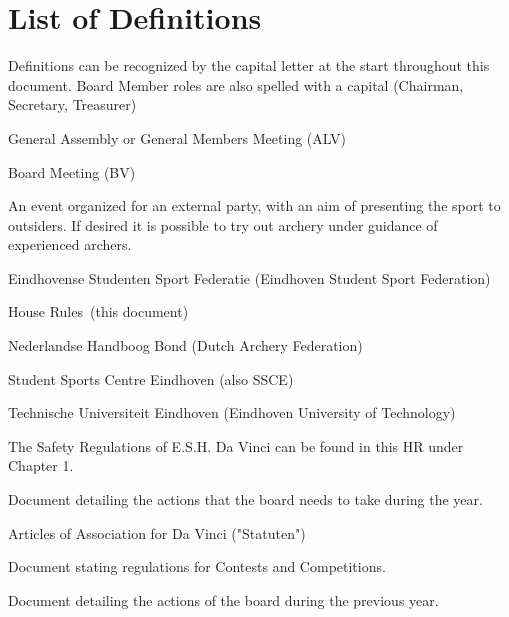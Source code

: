 \documentclass[a4paper]{article}
\newcommand{\Abr}{Administrative Regulations} %
\newcommand{\Asta}{Bylaws} %
\newcommand{\Ahr}{House Rules} %
\newcommand{\Asr}{Safety Rules} %
\newcommand{\Awr}{Contest Rules} %
\newcommand{\Ajv}{Annual Report} %
\begin{document}
\tableofcontents
\pagebreak
\section*{List of Definitions}
{\g Definitions can be recognized by the capital letter at the start throughout this document. Board Member roles are also spelled with a capital (Chairman, Secretary, Treasurer)}

\begin{description}[font=\sffamily\bfseries, leftmargin=1cm, style=nextline]
  \item[GA]
    General Assembly or General Members Meeting (ALV)
  \item[BM]
    Board Meeting (BV)
  \item[Workshop]
    An event organized for an external party, with an aim of presenting the sport to outsiders. If desired it is possible to try out archery under guidance of experienced archers.
    \item[ESSF]
    Eindhovense Studenten Sport Federatie (Eindhoven Student Sport Federation)
    \item[HR]
    \Ahr\ (this document)
    \item[NHB]
    Nederlandse Handboog Bond (Dutch Archery Federation)
    \item[SSC]
    Student Sports Centre Eindhoven (also SSCE)
    \item[TU/e]
    Technische Universiteit Eindhoven (Eindhoven University of Technology)
    \item[\Asr]
    The Safety Regulations of E.S.H. Da Vinci can be found in this HR under Chapter 1.
\item[\Abr] Document detailing the actions that the board needs to take during the year.
\item[\Asta] Articles of Association for Da Vinci ("Statuten")
\item[\Awr] Document stating regulations for Contests and Competitions.
\item[\Ajv] Document detailing the actions of the board during the previous year.
    

\end{description}
\end{document}
